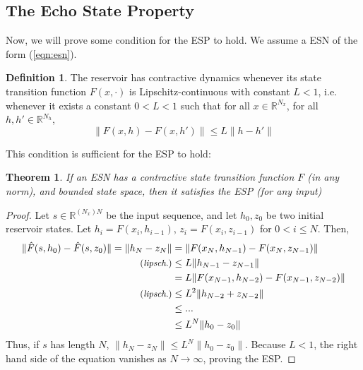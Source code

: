 \documentclass[oneside]{book}
\newcommand{\R}{\mathbb{R}}
\theoremstyle{definition}
\newtheorem{defn}{Definition}
\theoremstyle{plain}
\newtheorem{teo}{Theorem}
\begin{document}
\subsection{The Echo State Property}
Now, we will prove some condition for the ESP to hold. We assume a ESN of the form (\ref{eqn:esn}).

\begin{defn}
    The reservoir has contractive dynamics whenever its state transition function $F(x, \cdot)$ is Lipschitz-continuous with constant $L<1$, i.e. whenever it exists a constant $0<L<1$ such that
    for all $x\in \R^{N_x}$, for all $h, h'\in\R^{N_h}$,
    \[
        \|F(x, h)-F(x, h')\|\leq L\|h-h'\|
    \]
\end{defn}
This condition is sufficient for the ESP to hold:
\begin{teo}\label{teo:contractive}
    If an ESN has a contractive state
transition function $F$ (in any norm), and bounded
state space, then it satisfies the ESP (for any
input)
\end{teo}
\begin{proof}
    Let $s\in\R^{(N_x) N}$ be the input sequence, and let $h_0, z_0$ be two initial reservoir states. Let $h_i=F(x_i, h_{i-1})$, $z_i=F(x_i, z_{i-1})$ for $0<i\leq N$.
    Then, 
    \begin{align*}
        \|\hat{F}(s, h_0)- \hat{F}(s, z_0)\|=\|h_N-z_N\|&= \|F(x_N, h_{N-1})- F(x_N,z_{N-1})\|\\
        \text{\small{(\textit{lipsch}.)}}&\leq L\|h_{N-1}- z_{N-1}\|\\
        &=L\|F(x_{N-1}, h_{N-2}) - F(x_{N-1}, z_{N-2})\| \\
        \text{\small{(\textit{lipsch}.)}}&\leq L^2\|h_{N-2}+ z_{N-2}\| \\      
        &\leq ...\\
        &\leq L^N \|h_0-z_0\|
    \end{align*}
Thus, if $s$ has length $N$, $\|h_N-z_N\|\leq L^N\|h_0-z_0\|$. Because $L<1$, the right hand side of the equation vanishes as $N\to\infty$, proving the ESP. 
\end{proof}
\end{document}
